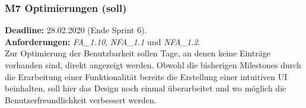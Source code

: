 \subsubsection{M7 Optimierungen (soll)}
\textbf{Deadline: } 28.02.2020 (Ende Sprint 6). \\
\textbf{Anforderungen: }\emph{FA\_1.10}, \emph{NFA\_1.1} und \emph{NFA\_1.2}.\\
Zur Optimierung der Benutzbarkeit sollen Tage, an denen keine Einträge vorhanden sind, direkt angezeigt werden. Obwohl die bisherigen Milestones durch die Erarbeitung einer Funktionalität bereits die Erstellung einer intuitiven UI beinhalten, soll hier das Design noch einmal überarbeitet und wo möglich die Benutzerfreundlichkeit verbessert werden.
